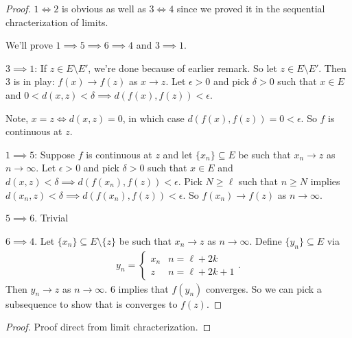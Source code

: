 \documentclass{report}
\begin{document}
\begin{proof}
    $1 \iff 2$ is obvious as well as $3 \iff 4$ since we proved it in the sequential chracterization of limits.

    We'll prove $1 \implies 5 \implies 6 \implies 4$ and $3 \implies 1$. 

    $3 \implies 1$: If $z \in E \setminus E'$, we're done because of earlier remark. So let $z \in E \setminus E'$. Then $3$ is in play: $f(x) \to f(z)$ as $x \to z$. Let $\epsilon > 0$ and pick $\delta > 0$ such that $x \in E$ and $0 < d(x, z) < \delta \implies d(f(x), f(z)) < \epsilon$.

    Note, $x = z \iff d(x, z) = 0$, in which case $d(f(x), f(z)) = 0 < \epsilon$. So $f$ is continuous at $z$.

    $1 \implies 5$: Suppose $f$ is continuous at $z$ and let $\{x_n \} \subseteq E$ be such that $x_n \to z$ as $n \to \infty$. Let $\epsilon > 0$ and pick $\delta > 0$ such that $x \in E$ and $d(x, z) < \delta \implies d(f(x_n), f(z)) < \epsilon$. Pick $N \geq \ell$ such that $n \geq N$ implies $d(x_n , z) < \delta \implies d(f(x_n), f(z)) < \epsilon$. So $f(x_n) \to f(z)$ as $n \to \infty$. 

    $5 \implies 6$. Trivial

    $6 \implies 4$. Let $\{x_n\} \subseteq E \setminus \{z\}$ be such that $x_n \to z$ as $n \to \infty$. Define $\{y_n\} \subseteq E$ via 
    \begin{align*}
        y_n = \begin{cases}
        x_n & n = \ell + 2k \\
        z & n = \ell + 2k + 1
        \end{cases}.
    \end{align*}
    Then $y_n \to z$ as $n \to \infty$. 6 implies that $f(y_n)$ converges. So we can pick a subsequence to show that is converges to $f(z)$.
\end{proof}

\newpage
{}
\begin{proof}
    Proof direct from limit chracterization.
\end{proof}
\end{document}
